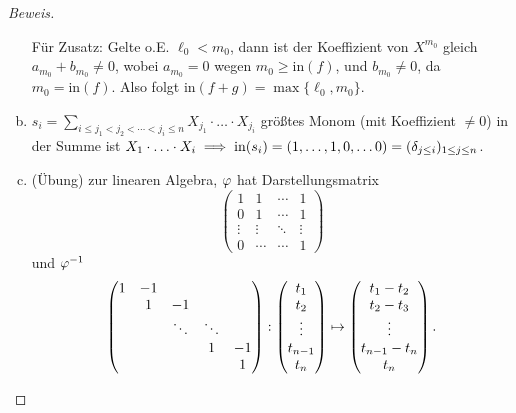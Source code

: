 \documentclass[a4paper]{report}
\begin{document}
\begin{prop}
\begin{proof}[Beweis]
\begin{enumerate}[(a)]
  Für Zusatz: Gelte o.E. $\ell_{0} < m_{0}$, dann ist der Koeffizient von $X^{m_{0}}$ gleich $a_{m_{0}} + b_{m_{0}} \ne 0$, wobei $a_{m_{0}} = 0$ wegen $m_{0} \ge \mathrm {in}(f)$, und $b_{m_{0}} \ne 0$, da $m_{0} = \mathrm{in}(f)$. Also folgt $\mathrm{in}(f+g) = \max\{\ell_{0}, m_{0}\}$.

  \item $s_{i} = \sum_{i \le j_{1} < j_{2} < \cdots < j_{i} \le n} X_{j_{1}}\cdot \ldots \cdot X_{j_{i}}$ größtes Monom (mit Koeffizient $\ne 0$) in der Summe ist $X_{1} \cdot \ldots \cdot X_{i} \implies \mathrm{in}(s_{i}) = (1, \ldots, 1, 0, \ldots 0) = (\delta_{j \le i})_{1 \le j \le n}$.
  \item (Übung) zur linearen Algebra, $\varphi$ hat Darstellungsmatrix
        \[
        \begin{pmatrix}
           1 & 1 & \cdots & 1 \\
           0 & 1 & \cdots & 1 \\
           \vdots & \vdots & \ddots & \vdots \\
           0 & \cdots& \cdots & 1
        \end{pmatrix}\]
        und $\varphi^{-1}$
        \[
        \begin{pmatrix}
          1 & -1 \\
            & 1 & -1 \\
            & & \ddots & \ddots \\
            & & &  1 & -1 \\
            & & & & 1
        \end{pmatrix} :
        \begin{pmatrix}
          t_{1} \\ t_{2} \\ \vdots  \\ t_{n-1} \\ t_{n}
        \end{pmatrix} \mapsto
        \begin{pmatrix}
          t_{1} - t_{2} \\
          t_{2} - t_{3} \\
          \vdots \\
          t_{n-1} - t_{n} \\
          t_{n}\\
        \end{pmatrix}. \qedhere\]
\end{enumerate}
\end{proof}
\end{prop}
\end{document}
